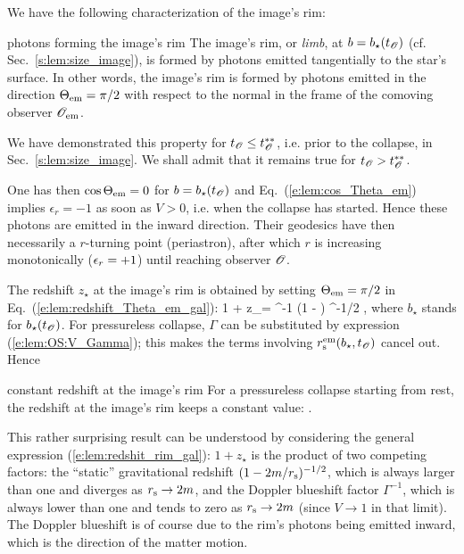 We have the following characterization of the image's rim:
\begin{tprop}{photons forming the image's rim}{}
The image's rim, or \emph{limb}, at $b=b_\star(t_{\mathscr{O}})$ (cf. Sec.~\ref{s:lem:size_image}),
is formed by photons emitted tangentially to the
star's surface. In other words, the image's rim is formed by photons
emitted in the direction $\Theta_{\rm em} = \pi/2$ with respect to the normal
in the frame of the comoving observer $\mathscr{O}_{\rm em}$.
\end{tprop}
We have demonstrated this property for $t_{\mathscr{O}} \leq t_{\mathscr{O}}^{**}$, i.e. prior to the collapse,
in Sec.~\ref{s:lem:size_image}. We shall admit that it remains true for
$t_{\mathscr{O}} > t_{\mathscr{O}}^{**}$.

One has then $\cos\Theta_{\rm em} = 0$ for $b=b_\star(t_{\mathscr{O}})$
and Eq.~(\ref{e:lem:cos_Theta_em}) implies $\epsilon_r = -1$ as soon as $V>0$, i.e. when
the collapse has started. Hence these photons are emitted in the inward direction.
Their geodesics have then necessarily a $r$-turning point (periastron), after which $r$
is increasing monotonically ($\epsilon_r = +1$) until reaching observer $\mathscr{O}$.

The redshift $z_\star$ at the image's rim is obtained by
setting $\Theta_{\rm em} = \pi/2$ in Eq.~(\ref{e:lem:redshift_Theta_em_gal}):
\be \label{e:lem:redshit_rim_gal}
    1 + z_\star = \Gamma^{-1}
    \left(1 - \right) ^{-1/2} ,
\ee
where $b_\star$ stands for $b_\star(t_{\mathscr{O}})$. For pressureless collapse,
$\Gamma$ can be substituted by expression (\ref{e:lem:OS:V_Gamma}); this
makes the terms involving $r_{\rm s}^{\rm em}(b_\star, t_{\mathscr{O}})$ cancel out.
Hence
\begin{tprop}{constant redshift at the image's rim}{}
For a pressureless collapse starting from rest,
the redshift at the image's rim keeps a constant value:
\be \label{e:lem:redhsit_rim_pless}
    .
\ee
\end{tprop}
This rather surprising result can be understood by considering the general
expression (\ref{e:lem:redshit_rim_gal}): $1 + z_\star$ is the product
of two competing factors: the ``static'' gravitational redshift
$(1 - 2m/r_{\rm s})^{-1/2}$, which is always larger than one and diverges
as $r_{\rm s}\to 2m$, and the Doppler blueshift factor $\Gamma^{-1}$, which
is always lower than one and tends to zero as $r_{\rm s}\to 2m$ (since $V\to 1$
in that limit). The Doppler blueshift is of course due to the rim's photons being
emitted inward, which is the direction of the matter motion.

